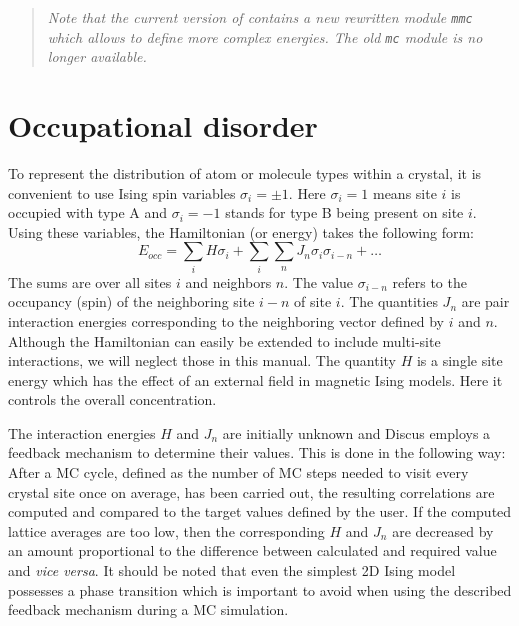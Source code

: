 \begin{quote}
  {\it Note that the current version of \Discus contains a new
  rewritten module {\tt mmc} which allows to define more complex
  energies. The old {\tt mc} module is no longer available.}
\end{quote}

\section{Occupational disorder \label{mc-corr-occ}}

To represent the distribution of atom or molecule types within a
crystal, it is convenient to use Ising spin variables $\sigma_{i}
= \pm 1$.  Here $\sigma_{i} = 1$ means site $i$ is occupied with
type A and $\sigma_{i} = -1$ stands for type B being present on
site $i$.  Using these variables, the Hamiltonian (or energy)
takes the following form:
%
\begin{equation}
    E_{occ} = \sum_{i} H \sigma_{i} +
              \sum_{i}\sum_{n} J_{n} \sigma_{i} \sigma_{i-n} + \ldots
    \label{mc-eq2}
\end{equation}
%
The sums are over all sites $i$ and neighbors $n$.  The value
$\sigma_{i-n}$ refers to the occupancy (spin) of the neighboring
site $i-n$ of site $i$.  The quantities $J_{n}$ are pair interaction
energies corresponding to the neighboring vector defined by $i$ and
$n$.  Although the Hamiltonian can easily be extended to include
multi-site interactions, we will neglect those in this manual.  The
quantity $H$ is a single site energy which has the effect of an
external field in magnetic Ising models. Here it controls the
overall concentration.\par

The interaction energies $H$ and $J_{n}$ are initially unknown and
Discus employs a feedback mechanism to determine their values.
This is done in the following way: After a MC cycle, defined as the
number of MC steps needed to visit every crystal site once on
average, has been carried out, the resulting correlations are
computed and compared to the target values defined by the user.  If
the computed lattice averages are too low, then the corresponding
$H$ and $J_{n}$ are decreased by an amount proportional to the
difference between calculated and required value and {\it vice
versa}. It should be noted that even the simplest 2D Ising model
possesses a phase transition which is important to avoid when using
the described feedback mechanism during a MC simulation. \par


